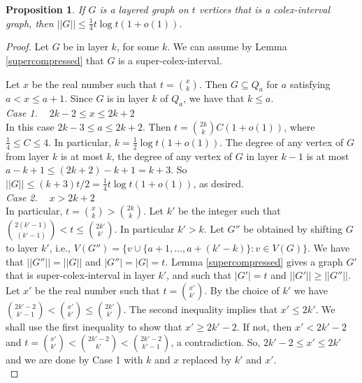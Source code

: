 \documentclass[11pt, a4paper]{article}
\newtheorem{proposition}[theorem]{Proposition}
\begin{document}
\vskip 1cm


\begin{proposition}\label{super}
If $G$ is a layered graph on $t$ vertices that is a colex-interval graph, then $||G|| \leq \frac{1}{4} t \log t (1+o(1))$. 
\end{proposition}

\begin{proof}


Let  $G$ be in layer  $k$, for some $k$.
We can assume by Lemma \ref{supercompressed} that $G$ is a super-colex-interval.  


Let $x$ be the real number such that $t = \binom{x}{k}$.  Then $G \subseteq Q_{a}$ for  $a$ satisfying $a < x \leq a+1$.  Since $G$ is in layer $k$ of $Q_a$, we have that $k\leq a$. \\


{\it Case 1. ~}  $2k-2  \leq x \leq 2k+2 $\\
In this case $ 2k-3 \leq a \leq 2k+2 $.
Then $t = \binom{2k}{k}C(1+o(1))$, where $\frac{1}{4} \leq C \leq 4$.  In particular,    $k= \frac{1}{2}\log t (1+o(1))$.  
The degree of any vertex of $G$ from layer $k$ is at most $k$, the degree of any vertex of $G$ in layer $k-1$ is at most $a-k+1 \leq  (2k+2)- k+1 = k+3$.   So $||G|| \leq (k+3) t/2 = \frac{1}{4}t\log t (1+o(1))$, as desired.\\



{\it Case 2. ~}  $x> 2k+2$\\
  In particular, $t = \binom{x}{k} > \binom{2k}{k}$.
Let $k'$ be the integer such that $\binom{2(k'-1)}{(k'-1)}<t\leq \binom{2k'}{k'}$. In particular $k'> k$.
Let $G''$ be obtained by shifting $G$ to layer $k'$, i.e., 
$V(G'') = \big\{v \cup \{a+1, \ldots, a+ (k'-k)\}:  v\in V(G)\big\}$. We have that $||G''||=||G||$ and $|G''|=|G|=t$.
Lemma \ref{supercompressed} gives a graph $G'$ that is super-colex-interval in layer $k'$,  and such that  $|G'|=t$ and $||G'||\geq ||G''||$.  Let $x'$ be the real number such that $t = \binom{x'}{k'}$. By the choice of $k'$  we have
$\binom{2k'-2}{k'-1} < \binom{x'}{k'} \leq \binom{2k'}{k'}$. 
The second inequality implies that  $x' \leq 2k'$.
We shall use the first inequality to show that $x' \geq 2k'-2$. If not, then  $x' <2k'-2$ and  $t = \binom{x'}{k'} < \binom{2k'-2}{k'} < \binom{2k'-2}{k'-1}$, a contradiction.
So, $2k'-2 \leq x' \leq 2k'$ and we are done by Case 1 with $k$ and $x$ replaced by $k'$ and $x'$. \\



\end{proof}
\end{document}
